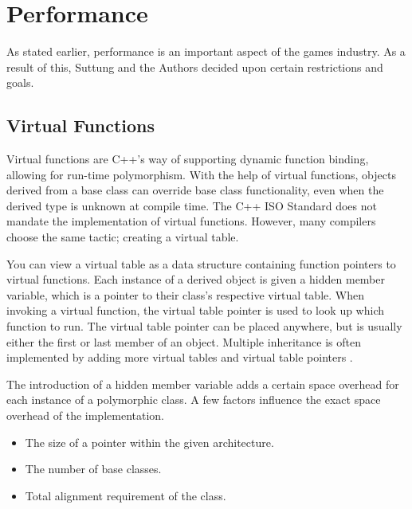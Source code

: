 
\section{Performance}
As stated earlier, performance is an important aspect of the games industry.
As a result of this, Suttung and the Authors decided upon certain restrictions and goals.

\subsection{Virtual Functions}
\label{subsec:requirements_performance_virtual_functions}
Virtual functions are C++'s way of supporting dynamic function binding, allowing for run-time polymorphism.
With the help of virtual functions, objects derived from a base class can override base class functionality, even when the derived type is unknown at compile time.
The C++ ISO Standard does not mandate the implementation of virtual functions.
However, many compilers choose the same tactic; creating a virtual table\cite{wikipedia_virtual_method_table}\cite[p. 140]{game_engine_architecture}.

You can view a virtual table as a data structure containing function pointers to virtual functions.
Each instance of a derived object is given a hidden member variable, which is a pointer to their class's respective virtual table.
When invoking a virtual function, the virtual table pointer is used to look up which function to run.
The virtual table pointer can be placed anywhere, but is usually either the first or last member of an object.
Multiple inheritance is often implemented by adding more virtual tables and virtual table pointers\cite{codersource_virtual_functions}
\cite[31:12]{andrei_alexandrescu_quick_code_quickly}.

The introduction of a hidden member variable adds a certain space overhead for each instance of a polymorphic class.
A few factors influence the exact space overhead of the implementation.
\begin{itemize}
    \item
    The size of a pointer within the given architecture.

    \item
    The number of base classes.

    \item
    Total alignment requirement of the class.
\end{itemize}


